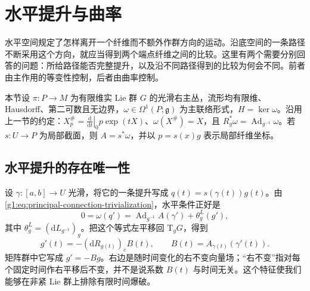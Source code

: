 
% 
% 

\section{水平提升与曲率}
\label{g1:sec:1803}

水平空间规定了怎样离开一个纤维而不额外作群方向的运动。沿底空间的一条路径不断采用这个方向，就应当得到两个端点纤维之间的比较。这里有两个需要分别回答的问题：所给路径能否完整提升，以及沿不同路径得到的比较为何会不同。前者由主作用的等变性控制，后者由曲率控制。

\ProseParagraphBreak

本节设 \(\pi:P\to M\) 为有限维实 Lie 群 \(G\) 的光滑右主丛，流形均有限维、Hausdorff、第二可数且无边界，\(\omega\in\Omega^1(P;\mathfrak g)\) 为主联络形式，\(H=\ker\omega\)。沿用上一节的约定：\(X^\#_p=\left.\frac{\mathrm{d}}{\mathrm{d}t}\right|_0p\exp(tX)\)、\(\omega(X^\#)=X\)，且 \(R_g^*\omega=\operatorname{Ad}_{g^{-1}}\omega\)。若 \(s:U\to P\) 为局部截面，则 \(A=s^*\omega\)，并以 \(p=s(x)g\) 表示局部纤维坐标。

\subsection{水平提升的存在唯一性}
\label{g1:subsec:1803:01}

设 \(\gamma:[a,b]\to U\) 光滑，将它的一条提升写成 \(q(t)=s(\gamma(t))g(t)\)。由\eqref{g1:eq:principal-connection-trivialization}，水平条件正好是
\[
	0=\omega(q')=\operatorname{Ad}_{g^{-1}}A(\gamma')+\theta^L_g(g'),
\]
其中 \(\theta^L_g=(\mathrm{d}L_{g^{-1}})_g\)。把这个等式左平移回 \(\mathrm{T}_gG\)，得到
\begin{equation}\label{g1:eq:principal-horizontal-ode}
	g'(t)=-(\mathrm{d}R_{g(t)})_eB(t),\qquad B(t)=A_{\gamma(t)}(\gamma'(t)).
\end{equation}
矩阵群中它写成 \(g'=-Bg\)。右边是随时间变化的右不变向量场；“右不变”指对每个固定时间作右平移后不变，并不是说系数 \(B(t)\) 与时间无关。这个特征使我们能够在非紧 Lie 群上排除有限时间爆破。

